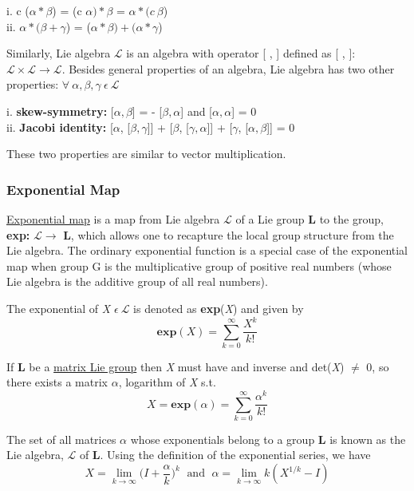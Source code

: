 i. c ($\alpha * \beta$) = (c $\alpha) * \beta$ = $\alpha * (c \: \beta$) \\
ii. $\alpha * (\beta + \gamma $) = ($\alpha * \beta) + (\alpha* \gamma $)

Similarly, Lie algebra $\mathcal{L}$ is an algebra with operator [ , ] defined as [ , ]:$\mathcal{L} \times \mathcal{L} \rightarrow \mathcal{L}$.
Besides general properties of an algebra, Lie algebra has two other properties:
$\forall \: \alpha, \beta, \gamma \: \epsilon \: \mathcal{L}$

i. \textbf{skew-symmetry: } [$\alpha, \beta$] = - [$\beta, \alpha$] and [$\alpha, \alpha$] = 0 \\
ii. \textbf{Jacobi identity: } [$\alpha$, [$\beta, \gamma$]] + [$\beta$, [$\gamma, \alpha$]] + [$\gamma$, [$\alpha, \beta$]] = 0

These two properties are similar to vector multiplication.

\subsubsection{Exponential Map}
\href{https://en.wikipedia.org/wiki/Exponential_map_(Lie_theory)}{Exponential map} is a map from Lie algebra $\mathcal{L}$ of a Lie group \textbf{L} to the group, \textbf{exp:} $\mathcal{L} \rightarrow$ \textbf{L}, 
which allows one to recapture the local group structure from the Lie algebra. The ordinary exponential function is a special case of the exponential map when 
group G is the multiplicative group of positive real numbers (whose Lie algebra is the additive group of all real numbers).

The exponential of \textit{X} $\epsilon \: \mathcal{L}$ is denoted as \textbf{exp}(\textit{X}) and given by
\begin{equation}
    \textbf{exp}(X) = \sum_{k=0}^{\infty} \frac{X^k}{k!}
\end{equation}

If \textbf{L} be a \href{https://en.wikipedia.org/wiki/Lie_group#Matrix_Lie_groups}{matrix Lie group} then \textit{X} must have and inverse and det(\textit{X}) $\neq$ 0, so
there exists a matrix $\alpha$, logarithm of \textit{X} s.t.
\begin{equation}
    X = \textbf{exp}(\alpha) = \sum_{k=0}^{\infty} \frac{\alpha^k}{k!}
\end{equation}

The set of all matrices $\alpha$ whose exponentials belong to a group \textbf{L} is known as the Lie algebra, $\mathcal{L}$ of \textbf{L}.
Using the definition of the exponential series, we have
\begin{equation}
    X = \lim_{k \rightarrow \infty} \Big(I + \frac{\alpha}{k} \Big)^k \; \text{  and  } \; \alpha = \lim_{k \rightarrow \infty} k(X^{1/k}-I)
\end{equation}

